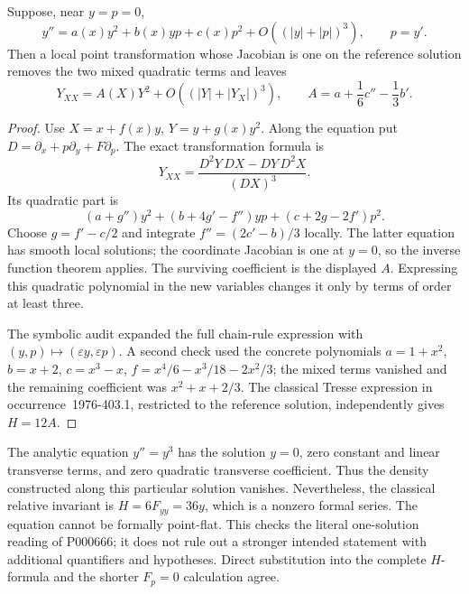 \begin{proposition}\ours{}
Suppose, near \(y=p=0\),
\[
 y''=a(x)y^2+b(x)yp+c(x)p^2+O((|y|+|p|)^3),\qquad p=y'.
\]
Then a local point transformation whose Jacobian is one on the reference solution removes the two mixed quadratic terms and leaves
\[
 Y_{XX}=A(X)Y^2+O((|Y|+|Y_X|)^3),\qquad
 A=a+\frac16c''-\frac13b'.
\]
\end{proposition}
\begin{proof}
Use \(X=x+f(x)y\), \(Y=y+g(x)y^2\). Along the equation put \(D=\partial_x+p\partial_y+F\partial_p\). The exact transformation formula is
\[
 Y_{XX}=\frac{D^2Y\,DX-DY\,D^2X}{(DX)^3}.
\]
Its quadratic part is
\[
 (a+g'')y^2+(b+4g'-f'')yp+(c+2g-2f')p^2.
\]
Choose \(g=f'-c/2\) and integrate \(f''=(2c'-b)/3\) locally. The latter equation has smooth local solutions; the coordinate Jacobian is one at \(y=0\), so the inverse function theorem applies. The surviving coefficient is the displayed \(A\). Expressing this quadratic polynomial in the new variables changes it only by terms of order at least three.

The symbolic audit expanded the full chain-rule expression with \((y,p)\mapsto(\varepsilon y,\varepsilon p)\). A second check used the concrete polynomials \(a=1+x^2\), \(b=x+2\), \(c=x^3-x\), \(f=x^4/6-x^3/18-2x^2/3\); the mixed terms vanished and the remaining coefficient was \(x^2+x+2/3\). The classical Tresse expression in occurrence~1976-403.1, restricted to the reference solution, independently gives \(H=12A\).
\end{proof}

\begin{example}\ours{}
The analytic equation \(y''=y^3\) has the solution \(y=0\), zero constant and linear transverse terms, and zero quadratic transverse coefficient. Thus the density constructed along this particular solution vanishes. Nevertheless, the classical relative invariant is \(H=6F_{yy}=36y\), which is a nonzero formal series. The equation cannot be formally point-flat. This checks the literal one-solution reading of P000666; it does not rule out a stronger intended statement with additional quantifiers and hypotheses. Direct substitution into the complete \(H\)-formula and the shorter \(F_p=0\) calculation agree.
\end{example}

